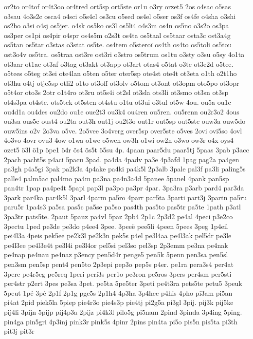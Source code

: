 {or2to
or4tof
or4t3oo
or4tred
ort5sp
ort5ste
or1u
o3ry
orzet5
2os
o4sac
o5sas
o3sau
4o3s2c
osca4
o4sci
o5s4cl
os3cu
o5sed
os4el
o5ser
os3f
os4fe
o4sha
o3shi
os2ho
o3si
o4sj
os5jer.
o4sk
os5ko
os3l
os5li4
o4s3m
os4n
os5no
o3s2o
os3pa
os3per
os1pi
os4pir
o4spr
os4s5m
o2s3t
os4ta
os5taal
os5taar
osta3c
ost3a4g
os5tan
os5tar
o3stas
o3stat
os5te.
os4tem
o5steroï
os4th
os4to
os5toli
os5tou
ost3o4v
os5tra.
os5traa
ost3re
ost3ri
o3stro
os5trum
os1tu
o3sty
o3su
o5sy
4o1ta
ot3aar
ot1ac
ot3af
o3tag
ot3akt
ot3app
ot3art
otas4
o5tat
o3te
ot3e2d
o5tee.
o5tees
o5teg
ot3ei
ote4lan
o5ten
o5ter
oter5sp
ote4st
ote4t
ot3eta
o1th
o2t1ho
ot3hu
o4tj
otje5sp
otli2
o1to
ot3off
ot3olv
o5tom
ot3ont
ot3opm
oto5po
ot3opr
o5t4or
oto3s
2otr
o1t4ro
ot3ru
ot5s4i
ot2sl
ot3sla
ots3li
ot3smo
ot3sn
ot3sp
ot4s3pa
ot4ste.
ots5tek
ot5sten
ot4stu
o1tu
ot3ui
o3tul
ot5w
4ou.
ou5a
ou1c
ou4d1a
ou4des
ou2do
ou1e
oue2t3
ou3k4
ou4ren
ou5ren.
ou5renn
ou2r3o2
4ous
ou3sa
ous5c
oust4
ou2ta
out3h
out1j
ou2t3o
out1r
out5sp
out5ste
ouw3a
ouw5do
ouw5ins
o2v
2o3va
o5ve.
2o5vee
3o4verg
over5sp
over5ste
o5ves
2ovi
ovi5so
4ovl
4o3vo
4ovr
ovu3
4ow
o1wa
o1we
o5wen
ow3h
o1wi
ow2n
o3wo
ow3r
o4x
oys4
ozet5
ö3l
ö1p
öpe1
ö4r
ös4
ös5t
ö5su
4p.
4paan
paar5du
paar5tj
5paas
3pab
p3acc
2pach
pacht5s
p4aci
5pacu
3pad.
pa4da
4padv
pa3e
4p3afd
1pag
pag2a
pa4gen
pa3gh
p4a5gi
3pak
pa2k3a
4p4ake
pa4ki
pa4k5l
2p3alb
3pale
pal3f
pa3li
paling5s
palle4
palm5ac
pal4mo
pa4m
pa3na
pa4n3a4d
5panee
5panel
4pank
pan5sp
pan4tr
1pap
pa4pe4t
5papi
pap3l
pa3po
pa3pr
4par.
3pa3ra
p3arb
pard4
par3da
3park
par4ka
par4k5l
3parl
4parm
pa5ro
4parr
par5ta
3parti
part3j
3partn
pa5ru
paru5r
1pa4s3
pa5sa
pas5c
pa5se
pa5so
pas4th
pas5to
pas5tr
pa5te
1path
p3atl
3pa3tr
pats5te.
2paut
5pauz
pa4vl
5paz
2pb4
2p1c
2p3d2
pe4al
4peci
p3e2co
3pectu
1ped
pe3de
pe3do
p4ee4
3pee.
3peeë
pee5li
4peen
5pees
3peg
1p4eil
pei4l3a
4peis
pek5ee
pe2k3l
pe2k3n
pek5s
p4el
pe3l4aa
pe4l3ak
pel5dr
pe3le
pe4l3ee
pe4l3e4t
pe3l4i
pe3l4or
pel5si
pel3so
pel3sp
2p3emm
pe3na
pe4nak
pe4nap
pe4nau
pe4naz
p3ency
pen5d4r
penge5
pen5k
5penn
pen3sa
pen5sl
pen3sm
pen5sp
pent4
pen5to
2p3epi
pep3o
pep5s
p4er.
pe1ra
pera3s4
per4at
3perc
pe4r5eg
pe5req
1peri
peri3s
per1o
pe3ron
pe5ros
3pers
per4sm
per5sti
per4str
p2ert
3pes
pe3sa
3pet.
pe5ta
5pe5ter
3peti
pe4t3ra
pets5te
petu5
3peuk
5peut
1pé
3pê
2p1f
2p1g
pge5s
2p1h4
4p3ha
3p4hec
p4his
4pho
pi3am
pi5an
pi4at
2pid
piek5la
5piep
pie4r3o
pie4s3p
pie4tj
pi2g5a
pi3gl
3pij.
pij3k
pij5ke
pij4li
3pijn
5pijp
pij4p3a
2pijz
pi4k3l
pilo5g
pi5nam
2pind
3pinda
3p4ing
5ping.
pin4ga
pin5gri
4p3inj
pink3r
pink5s
4pinr
2pins
pin4ta
pi5o
pis5n
pis5ta
pi3th
pit3j
pit3r
}
